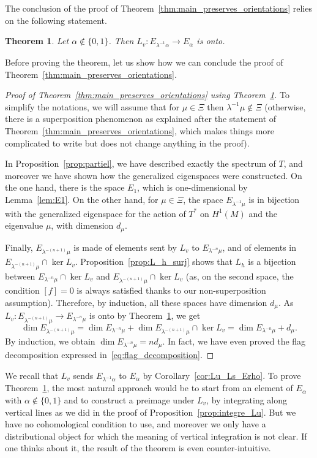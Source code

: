 \documentclass[JEP,XML,SOM,Unicode]{cedram}
\newtheorem{thm}{Theorem}[section]
\theoremstyle{definition}
\numberwithin{equation}{section}
\begin{document}
The conclusion of the proof of Theorem~\ref{thm:main_preserves_orientations}
relies on the following statement.
\begin{thm}
\label{thm:Lv_integre} Let $\alpha \notin \{0,1\}$. Then $L_v :
E_{\lambda^{-1}\alpha} \to E_\alpha$ is onto.
\end{thm}
Before proving the theorem, let us show how we can conclude the proof of
Theorem~\ref{thm:main_preserves_orientations}.

\begin{proof}[Proof of Theorem~\ref{thm:main_preserves_orientations} using
Theorem~\ref{thm:Lv_integre}] To simplify the notations, we will assume that
for $\mu \in \Xi$ then $\lambda^{-1} \mu \notin \Xi$ (otherwise, there is a
superposition phenomenon as explained after the statement of
Theorem~\ref{thm:main_preserves_orientations}, which makes things more
complicated to write but does not change anything in the proof).

In Proposition~\ref{prop:partiel}, we have described exactly the spectrum of
$T$, and moreover we have shown how the generalized eigenspaces were
constructed. On the one hand, there is the space $E_1$, which is
one-dimensional by Lemma~\ref{lem:E1}. On the other hand, for $\mu \in \Xi$,
the space $E_{\lambda^{-1}\mu}$ is in bijection with the generalized
eigenspace for the action of $T^*$ on $H^1(M)$ and the eigenvalue $\mu$, with
dimension $d_\mu$.

Finally, $E_{\lambda^{-(n+1)} \mu}$ is made of elements sent by $L_v$ to
$E_{\lambda^{-n} \mu}$, and of elements in $E_{\lambda^{-(n+1)} \mu} \cap
\ker L_v$. Proposition~\ref{prop:L_h_surj} shows that $L_h$ is a bijection
between $E_{\lambda^{-n} \mu} \cap \ker L_v$ and $E_{\lambda^{-(n+1)} \mu}
\cap \ker L_v$ (as, on the second space, the condition $[f] = 0$ is always
satisfied thanks to our non-superposition assumption). Therefore, by
induction, all these spaces have dimension $d_\mu$. As $L_v :
E_{\lambda^{-(n+1)} \mu} \to E_{\lambda^{-n} \mu}$ is onto by
Theorem~\ref{thm:Lv_integre}, we get
\begin{equation*}
\dim E_{\lambda^{-(n+1)} \mu} =
\dim E_{\lambda^{-n} \mu} + \dim E_{\lambda^{-(n+1)} \mu} \cap \ker L_v
= \dim E_{\lambda^{-n} \mu} + d_\mu.
\end{equation*}
By induction, we obtain $\dim E_{\lambda^{-n} \mu} = n d_\mu$. In fact, we
have even proved the flag decomposition expressed
in~\eqref{eq:flag_decomposition}.
\end{proof}

We recall that $L_v$ sends $E_{\lambda^{-1}\alpha}$ to $E_\alpha$ by
Corollary~\ref{cor:Lu_Ls_Erho}. To prove Theorem~\ref{thm:Lv_integre}, the
most natural approach would be to start from an element of $E_\alpha$ with
$\alpha\notin\{0,1\}$ and to construct a preimage under $L_v$, by integrating
along vertical lines as we did in the proof of
Proposition~\ref{prop:integre_Lu}. But we have no cohomological condition to
use, and moreover we only have a distributional object for which the meaning
of vertical integration is not clear. If one thinks about it, the result of
the theorem is even counter-intuitive.
\end{document}
